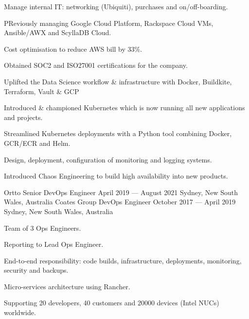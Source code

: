 \begin{experiences}
{\begin{cvitems}
      \item {Manage internal IT: networking (Ubiquiti), purchases and on/off-boarding.}
      \item {PReviously managing Google Cloud Platform, Rackspace Cloud VMs, Ansible/AWX and ScyllaDB Cloud.}
    \end{cvitems}
  }
  {
    \begin{cvitems}
      \item {Cost optimisation to reduce AWS bill by 33\%.}
      \item {Obtained SOC2 and ISO27001 certifications for the company.}
      \item {Uplifted the Data Science workflow \& infrastructure with Docker, Buildkite, Terraform, Vault \& GCP}
      \item {Introduced \& championed Kubernetes which is now running all new applications and projects.}
      \item {Streamlined Kubernetes deployments with a Python tool combining Docker, GCR/ECR and Helm.}
      \item {Design, deployment, configuration of monitoring and logging systems.}
      \item {Introduced Chaos Engineering to build high availability into new products.}
    \end{cvitems}
  }
  \expitem
  {Ortto} %
  {Senior DevOps Engineer} %
  {April 2019 --- August 2021} %
  {Sydney, New South Wales, Australia} %
  {} %
  {} %
  {} %
  \expitem
  {Coates Group} %
  {DevOps Engineer} %
  {October 2017 --- April 2019} %
  {Sydney, New South Wales, Australia} %
  {
    \begin{cvitems}
      \item {Team of 3 Ops Engineers.}
      \item {Reporting to Lead Ops Engineer.}
      \item {End-to-end responsibility: code builds, infrastructure, deployments, monitoring, security and backups.}
      \item {Micro-services architecture using Rancher.}
      \item {Supporting 20 developers, 40 customers and 20000 devices (Intel NUCs) worldwide.}
    \end{cvitems}
  }

\end{experiences}
